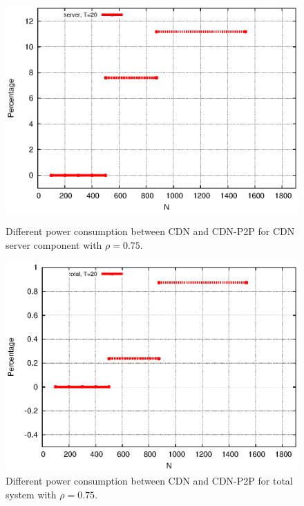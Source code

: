 \documentclass[conference]{IEEEtran}
\begin{document}
\begin{figure}[htp!]
\centering
\begin{minipage}[b]{0.4\linewidth}
	\includegraphics[scale=0.5]{graphs/diff-3.eps}
	\caption{Different power consumption between CDN and CDN-P2P for CDN server component with $\rho=0.75$.}
	\label{fig:diffs1}
\end{minipage}
\hfill
\begin{minipage}[b]{0.4\linewidth}
	\includegraphics[scale=0.5]{graphs/diff-3-total.eps}
	\caption{Different power consumption between CDN and CDN-P2P for total system with $\rho=0.75$.}
	\label{fig:diffs2}
\end{minipage}
\label{fig:maindiff2}
\end{figure}
\end{document}
